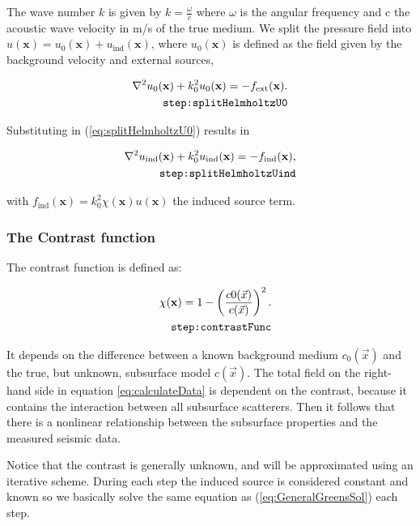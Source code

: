 \documentclass[10pt,a4paper]{article}
\begin{document}
The wave number $k$ is given by $k = \frac{\omega}{c}$ where $\omega$
is the angular frequency and c the
acoustic wave velocity in m/s of the true medium.
We split the pressure field into $u(\mathbf{x}) = u_0(\mathbf{x}) +
u_{\text{ind}}(\mathbf{x})$, where $u_0(\mathbf{x})$ is defined as the
field given by the background velocity and external sources,

\begin{align} \label{eq:splitHelmholtzU0}
\nabla^2 u_0(\mathbf{x}) + k_0^2 u_0(\mathbf{x}) = -f_{\text{ext}}(\mathbf{x}).\\
\tag*{\texttt{step:splitHelmholtzU0}}
\end{align}

Substituting in (\ref{eq:splitHelmholtzU0}) results in

\begin{align} \label{eq:splitHelmholtzUind}
\nabla^2 u_\text{ind}(\mathbf{x}) + k_0^2 u_\text{ind}(\mathbf{x}) =
-f_\text{ind}(\mathbf{x}),\\
\tag*{\texttt{step:splitHelmholtzUind}}
\end{align}

with $f_\text{ind}(\mathbf{x}) = k_0^2 \chi(\mathbf{x}) u(\mathbf{x})$
the induced source term.

\subsubsection{The Contrast function}
The contrast function is defined as:

\begin{align} \label{eq:contrastFunc}\chi(\mathbf{x}) = 1 -
\left(\frac{c0(\vec{x})}{c(\vec{x})} \right)^2.\\
\tag*{\texttt{step:contrastFunc}}
\end{align}

It depends on the difference between a known background medium
$c_\text{0}(\vec{x})$ and the true, but unknown, subsurface model
$c(\vec{x})$. The total field on the right-hand side in equation
\ref{eq:calculateData} is dependent on the contrast, because it contains the
interaction between all subsurface scatterers. Then it follows that
there is a nonlinear relationship between the subsurface properties
and the measured seismic data.

Notice that the contrast is generally unknown, and will be
approximated using an iterative scheme. During each step the induced
source is considered constant and known so we basically solve the same
equation as (\ref{eq:GeneralGreensSol}) each step.
\end{document}
